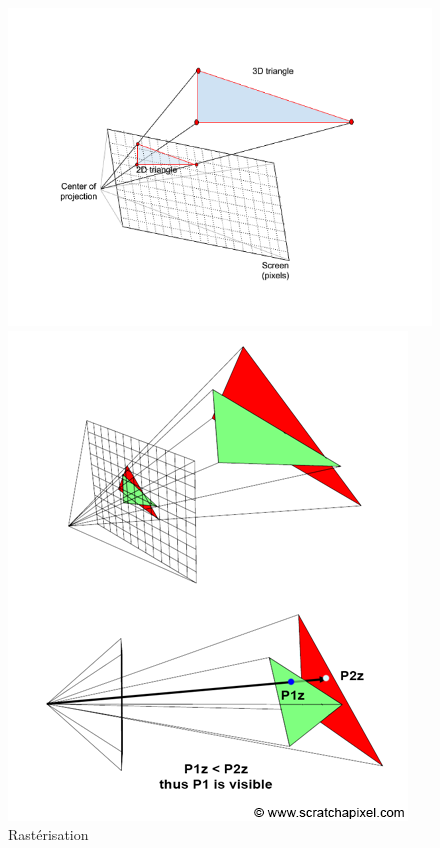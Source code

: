 \begin{figure}[h]
  \begin{minipage}[b]{0.45\linewidth}
    \centering
    \includegraphics[width=\linewidth]{images/shaders/raster00.png}
  \end{minipage}
  \hspace{0.1\linewidth} %
  \begin{minipage}[b]{0.45\linewidth}
    \centering
    \includegraphics[width=\linewidth]{images/shaders/rasterizer.png}
  \end{minipage}
  \caption{Rastérisation}
  \label{rasterizer}
\end{figure}

